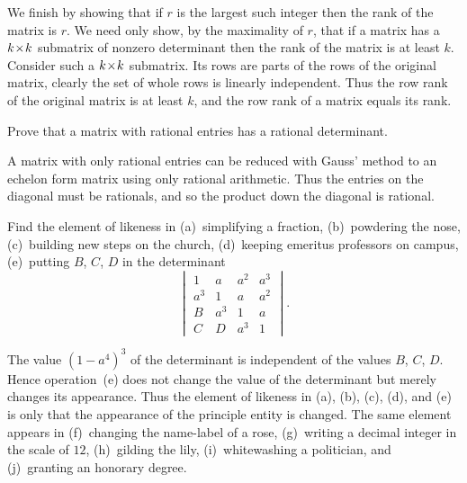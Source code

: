\begin{exercises}
\begin{answer}
      We finish by showing that if \( r \) is the largest such integer then
      the rank of the matrix is \( r \).
      We need only show, by the maximality of \( r \),
      that if a matrix has a \( k \! \times \! k \) submatrix of
      nonzero determinant then the rank of the matrix is at least \( k \).
      Consider such a \( k \! \times \! k \) submatrix.
      Its rows are parts of the rows of the original matrix, clearly the
      set of whole rows is linearly independent.
      Thus the row rank of the original matrix is at least \( k \), and the row
      rank of a matrix equals its rank.  
   \end{answer}
  \recommended \item
    Prove that a matrix with rational entries has a rational determinant.
    \begin{answer}
      A matrix with only rational entries can be reduced with Gauss'
      method to an echelon form matrix using only rational arithmetic.
      Thus the entries on the diagonal must be rationals, and so the product
      down the diagonal is rational.  
    \end{answer}
  \puzzle \item 
     Find the element of likeness in (a)~simplifying a fraction, (b)~powdering
     the nose, (c)~building new steps on the church, (d)~keeping emeritus
     professors on campus, (e)~putting \( B \), \( C \), \( D \) in the
     determinant
     \begin{equation*}
       \begin{vmatrix}
         1   &a   &a^2  &a^3  \\
         a^3 &1   &a    &a^2  \\
         B   &a^3 &1    &a    \\
         C   &D   &a^3  &1
       \end{vmatrix}.
     \end{equation*}
     \cite{Monthly53p115}
     \begin{answer}
       \answerasgiven
       The value \( (1-a^4)^3 \) of the determinant is independent of the
       values \( B \), \( C \), \( D \).
       Hence operation~(e) does not change the value of the determinant
       but merely changes its appearance.
       Thus the element of likeness in (a), (b), (c), (d), and (e) is
       only that the appearance of the principle entity is changed.
       The same element appears in (f)~changing the name-label of a rose,
       (g)~writing a decimal integer in the scale of \( 12 \), (h)~gilding
       the lily, (i)~whitewashing a politician, and (j)~granting an honorary
       degree.  
    \end{answer}
\end{exercises}



















